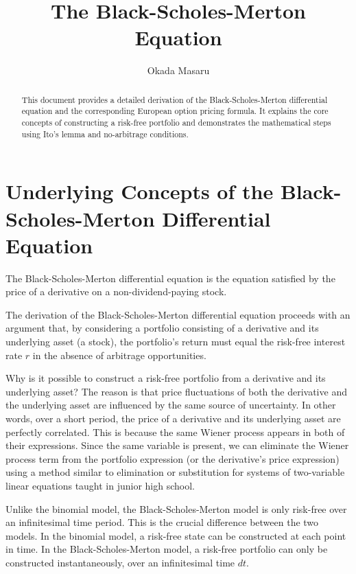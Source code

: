 \documentclass[uplatex]{jsarticle}
\title{The Black-Scholes-Merton Equation}
\author{
Okada Masaru
}
\begin{document}
\maketitle

\begin{abstract}
    This document provides a detailed derivation of the Black-Scholes-Merton differential equation and the corresponding European option pricing formula. It explains the core concepts of constructing a risk-free portfolio and demonstrates the mathematical steps using Ito's lemma and no-arbitrage conditions.
\end{abstract}

\section{Underlying Concepts of the Black-Scholes-Merton Differential Equation}

The Black-Scholes-Merton differential equation is the equation satisfied by the price of a derivative on a non-dividend-paying stock.

The derivation of the Black-Scholes-Merton differential equation proceeds with an argument that, by considering a portfolio consisting of a derivative and its underlying asset (a stock), the portfolio's return must equal the risk-free interest rate $r$ in the absence of arbitrage opportunities.

Why is it possible to construct a risk-free portfolio from a derivative and its underlying asset? The reason is that price fluctuations of both the derivative and the underlying asset are influenced by the same source of uncertainty. In other words, over a short period, the price of a derivative and its underlying asset are perfectly correlated. This is because the same Wiener process appears in both of their expressions. Since the same variable is present, we can eliminate the Wiener process term from the portfolio expression (or the derivative's price expression) using a method similar to elimination or substitution for systems of two-variable linear equations taught in junior high school.

Unlike the binomial model, the Black-Scholes-Merton model is only risk-free over an infinitesimal time period. This is the crucial difference between the two models. In the binomial model, a risk-free state can be constructed at each point in time. In the Black-Scholes-Merton model, a risk-free portfolio can only be constructed instantaneously, over an infinitesimal time $dt$.
\end{document}
